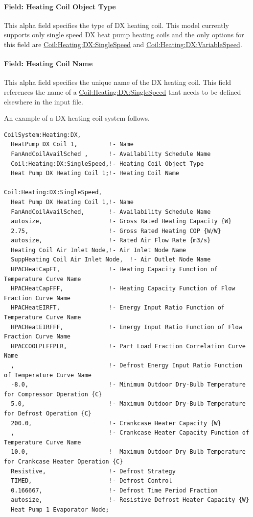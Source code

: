 \paragraph{Field: Heating Coil Object Type}\label{field-heating-coil-object-type-000}

This alpha field specifies the type of DX heating coil. This model currently supports only single speed DX heat pump heating coils and the only options for this field are \hyperref[coilheatingdxsinglespeed]{Coil:Heating:DX:SingleSpeed} and \hyperref[coilheatingdxvariablespeed]{Coil:Heating:DX:VariableSpeed}.

\paragraph{Field: Heating Coil Name}\label{field-heating-coil-name-000}

This alpha field specifies the unique name of the DX heating coil. This field references the name of a \hyperref[coilheatingdxsinglespeed]{Coil:Heating:DX:SingleSpeed} that needs to be defined elsewhere in the input file.

An example of a DX heating coil system follows.

\begin{lstlisting}
CoilSystem:Heating:DX,
  HeatPump DX Coil 1,         !- Name
  FanAndCoilAvailSched ,      !- Availability Schedule Name
  Coil:Heating:DX:SingleSpeed,!- Heating Coil Object Type
  Heat Pump DX Heating Coil 1;!- Heating Coil Name

Coil:Heating:DX:SingleSpeed,
  Heat Pump DX Heating Coil 1,!- Name
  FanAndCoilAvailSched,       !- Availability Schedule Name
  autosize,                   !- Gross Rated Heating Capacity {W}
  2.75,                       !- Gross Rated Heating COP {W/W}
  autosize,                   !- Rated Air Flow Rate {m3/s}
  Heating Coil Air Inlet Node,!- Air Inlet Node Name
  SuppHeating Coil Air Inlet Node,  !- Air Outlet Node Name
  HPACHeatCapFT,              !- Heating Capacity Function of Temperature Curve Name
  HPACHeatCapFFF,             !- Heating Capacity Function of Flow Fraction Curve Name
  HPACHeatEIRFT,              !- Energy Input Ratio Function of Temperature Curve Name
  HPACHeatEIRFFF,             !- Energy Input Ratio Function of Flow Fraction Curve Name
  HPACCOOLPLFFPLR,            !- Part Load Fraction Correlation Curve Name
  ,                           !- Defrost Energy Input Ratio Function of Temperature Curve Name
  -8.0,                       !- Minimum Outdoor Dry-Bulb Temperature for Compressor Operation {C}
  5.0,                        !- Maximum Outdoor Dry-Bulb Temperature for Defrost Operation {C}
  200.0,                      !- Crankcase Heater Capacity {W}
  ,                           !- Crankcase Heater Capacity Function of Temperature Curve Name
  10.0,                       !- Maximum Outdoor Dry-Bulb Temperature for Crankcase Heater Operation {C}
  Resistive,                  !- Defrost Strategy
  TIMED,                      !- Defrost Control
  0.166667,                   !- Defrost Time Period Fraction
  autosize,                   !- Resistive Defrost Heater Capacity {W}
  Heat Pump 1 Evaporator Node;
\end{lstlisting}

